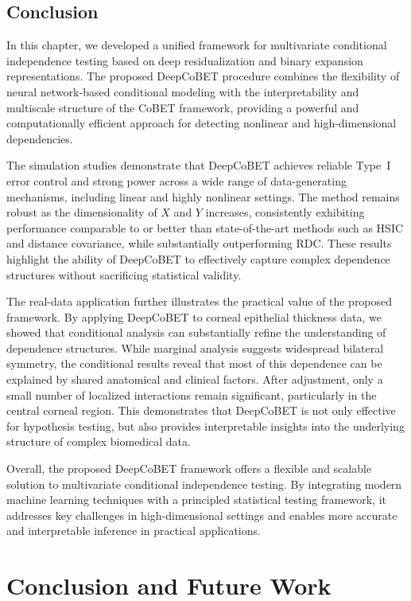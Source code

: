 \documentclass[12pt,reqno,oneside]{amsbook}
\theoremstyle{definition}
\theoremstyle{remark}
\begin{document}
\section{Conclusion}

In this chapter, we developed a unified framework for multivariate conditional
independence testing based on deep residualization and binary expansion
representations. The proposed DeepCoBET procedure combines the flexibility of
neural network-based conditional modeling with the interpretability and
multiscale structure of the CoBET framework, providing a powerful and
computationally efficient approach for detecting nonlinear and high-dimensional
dependencies.

The simulation studies demonstrate that DeepCoBET achieves reliable Type~I
error control and strong power across a wide range of data-generating
mechanisms, including linear and highly nonlinear settings. The method remains
robust as the dimensionality of $X$ and $Y$ increases, consistently exhibiting
performance comparable to or better than state-of-the-art methods such as HSIC
and distance covariance, while substantially outperforming RDC. These results
highlight the ability of DeepCoBET to effectively capture complex dependence
structures without sacrificing statistical validity.

The real-data application further illustrates the practical value of the
proposed framework. By applying DeepCoBET to corneal epithelial thickness data,
we showed that conditional analysis can substantially refine the understanding
of dependence structures. While marginal analysis suggests widespread bilateral
symmetry, the conditional results reveal that most of this dependence can be
explained by shared anatomical and clinical factors. After adjustment, only a
small number of localized interactions remain significant, particularly in the
central corneal region. This demonstrates that DeepCoBET is not only effective
for hypothesis testing, but also provides interpretable insights into the
underlying structure of complex biomedical data.

Overall, the proposed DeepCoBET framework offers a flexible and scalable
solution to multivariate conditional independence testing. By integrating
modern machine learning techniques with a principled statistical testing
framework, it addresses key challenges in high-dimensional settings and enables
more accurate and interpretable inference in practical applications.
\chapter{Conclusion and Future Work}
\end{document}
